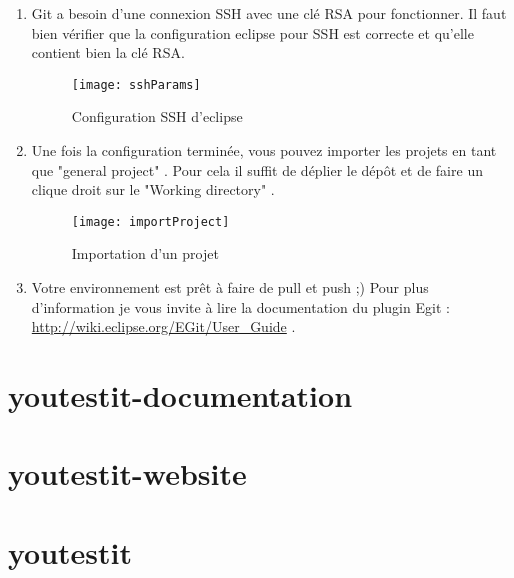 \begin{enumerate}
	 \item Git a besoin d'une connexion SSH avec une clé RSA pour fonctionner. Il faut
	 bien vérifier que la configuration eclipse pour SSH est correcte et qu'elle contient
	 bien la clé RSA.
		\begin{figure}[!h]
     		\begin{center}
			      \texttt{[image: sshParams]}
			      \caption{Configuration SSH d'eclipse}
			      \label{eclipseSshConfig}
		    \end{center}
		\end{figure}		 
	 
	\item Une fois la configuration terminée, vous pouvez importer les projets en tant que "general project" .
	Pour cela il suffit de déplier le dépôt et de faire un clique droit sur le "Working directory" .
		\begin{figure}[!h]
     		\begin{center}
			      \texttt{[image: importProject]}
			      \caption{Importation d'un projet}
			      \label{gitProjectImport}
		    \end{center}
		\end{figure}	
		
	\item Votre environnement est prêt à faire de pull et push ;)   Pour plus  d'information je vous invite à lire la
	documentation du plugin Egit : \href{http://wiki.eclipse.org/EGit/User\_Guide}{http://wiki.eclipse.org/EGit/User\_Guide} . 
 
	 
\end{enumerate}

\section{youtestit-documentation}


\section{youtestit-website}	


\section{youtestit}


